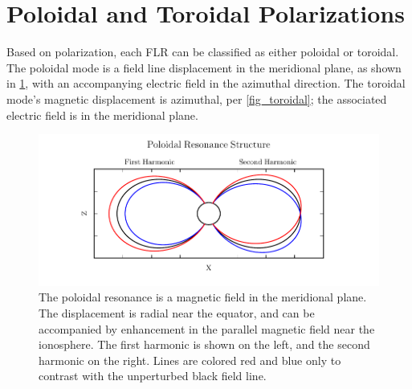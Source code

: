 \section{Poloidal and Toroidal Polarizations}


Based on polarization, each FLR can be classified as either poloidal or toroidal. The poloidal mode is a field line displacement in the meridional plane, as shown in \cref{fig_poloidal}, with an accompanying electric field in the azimuthal direction. The toroidal mode's magnetic displacement is azimuthal, per \cref{fig_toroidal}; the associated electric field is in the meridional plane. 

\begin{figure}[!htb]
    \centering
    \includegraphics[width=\textwidth]{figures/poloidal.pdf}
    \caption[Poloidal Mode Structure]{
      The poloidal resonance is a magnetic field in the meridional plane. The displacement is radial near the equator, and can be accompanied by enhancement in the parallel magnetic field near the ionosphere. The first harmonic is shown on the left, and the second harmonic on the right. Lines are colored red and blue only to contrast with the unperturbed black field line. 
    }
    \label{fig_poloidal}
\end{figure}

